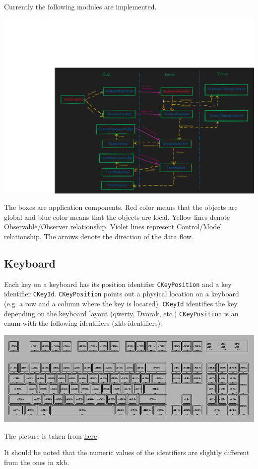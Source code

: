 \documentclass{article}
\begin{document}
Currently the following modules are implemented.

\begin{center}
\includegraphics[scale = 0.4]{Figures/Modules.png}
\end{center}

The boxes are application components. Red color means that the objects are global and blue color means that the objects are local. Yellow lines denote Observable/Observer relationship. Violet lines represent Control/Model relationship. The arrows denote the direction of the data flow.


\subsection{Keyboard}

Each key on a keyboard has its position identifier \verb"CKeyPosition" and a key identifier \verb"CKeyId". \verb"CKeyPosition" points out a physical location on a keyboard (e.g. a row and a column where the key is located). \verb"CKeyId" identifies the key depending on the keyboard layout (qwerty, Dvorak, etc.) \verb"CKeyPosition" is an enum with the following identifiers (xkb identifiers):
\begin{center}
\includegraphics[scale = 1]{Figures/KeyPosition.png}

The picture is taken from \href{https://www.charvolant.org/doug/xkb/html/node5.html}{here}
\end{center}
It should be noted that the numeric values of the identifiers are slightly different from the ones in xkb.
\end{document}
